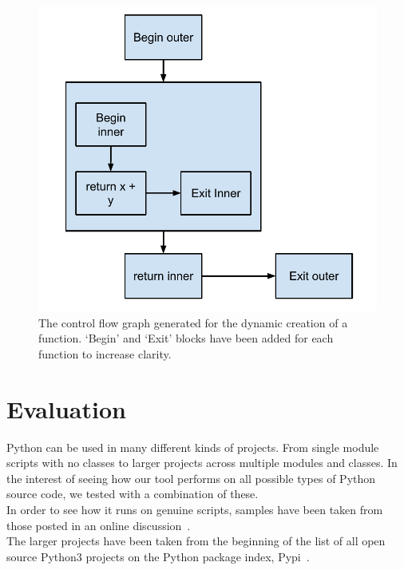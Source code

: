 \documentclass[12pt, titlepage]{article}
\begin{document}
\begin{figure}
\centering
\includegraphics[scale=0.7]{images/dynamicFunctionCFG.pdf}
\caption{The control flow graph generated for the dynamic creation of a function. `Begin' and `Exit' blocks have been added for each function to increase clarity.}
\label{fig:dynamicFuncCFG}
\end{figure}


\newpage
\section{Evaluation}
\label{chap:evaluation}
Python can be used in many different kinds of projects. From single module scripts with no classes to larger projects across multiple modules and classes. In the interest of seeing how our tool performs on  all possible types of Python source code, we tested with a combination of these. \\
\indent In order to see how it runs on genuine scripts, samples have been taken from those posted in an online discussion~\cite{pythonScripts}. \\
\indent The larger projects have been taken from the beginning of the list of all open source Python3 projects on the Python package index, Pypi~\cite{python3Projects}.
\end{document}
